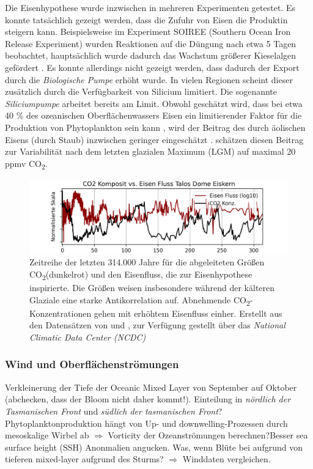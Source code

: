 \documentclass[12pt,a4paper,onecolumn]{scrartcl}
\newcommand{\cotwo}{CO\textsubscript{2}}
\begin{document}
Die Eisenhypothese wurde inzwischen in mehreren Experimenten getestet. Es konnte tatsächlich gezeigt werden, dass die Zufuhr von Eisen die Produktin steigern kann. Beispielsweise im Experiment SOIREE (Southern Ocean Iron Release Experiment) wurden Reaktionen auf die Düngung nach etwa 5 Tagen beobachtet, hauptsächlich wurde dadurch das Wachstum größerer Kieselalgen gefördert \citep{Trull.2001}. Es konnte allerdings nicht gezeigt werden, dass dadurch der Export durch die \textit{Biologische Pumpe} erhöht wurde. In vielen Regionen scheint dieser zusätzlich durch die Verfügbarkeit von Silicium limitiert. Die sogenannte \textit{Siliciumpumpe} arbeitet bereits am Limit. Obwohl geschätzt wird, dass bei etwa 40 \% des ozeanischen Oberflächenwassers Eisen ein limitierender Faktor für die Produktion von Phytoplankton sein kann \citep{Emerson.2009}, wird der Beitrag des durch äolischen Eisens (durch Staub) inzwischen geringer eingeschätzt \citep{Tagliabue.2017}. \citet{Vallelonga.2013} schätzen diesen Beitrag zur Variabilität nach dem letzten glazialen Maximum (LGM) auf maximal 20 ppmv \cotwo .

\begin{figure}[ht]
\centering
\includegraphics[width=\textwidth]{bilder/co2_iron.png}
\caption{ Zeitreihe der letzten 314.000 Jahre für die abgeleiteten Größen \cotwo (dunkelrot) und den Eisenfluss, die zur Eisenhypothese inspirierte. Die Größen weisen insbesondere während der kälteren Glaziale eine starke Antikorrelation auf. Abnehmende \cotwo -Konzentrationen gehen mit erhöhtem Eisenfluss einher. Erstellt aus den Datensätzen von \cite{Bereiter.2015} und \cite{Vallelonga.2013}, zur Verfügung gestellt über das \textit{National Climatic Data Center (NCDC) }  }   \label{fig:co2iron}
\end{figure}

\subsubsection{Wind und Oberflächenströmungen}
Verkleinerung der Tiefe der Oceanic Mixed Layer von September auf Oktober \citep{Tilburg.2002} (abchecken, dass der Bloom nicht daher kommt!). Einteilung in \textit{nördlich der Tasmanischen Front} und \textit{südlich der tasmanischen Front}? Phytoplanktonproduktion hängt von Up- und downwelling-Prozessen durch mesoskalige Wirbel ab \citep{Tilburg.2002} $\Rightarrow$ Vorticity der Ozeanströmungen berechnen?Besser sea surface height (SSH) Anonmalien angucken. Was, wenn Blüte bei \citet{Gabric.2016} aufgrund von tieferen mixed-layer aufgrund des Sturms? $\Rightarrow$ Winddaten vergleichen.
\end{document}
